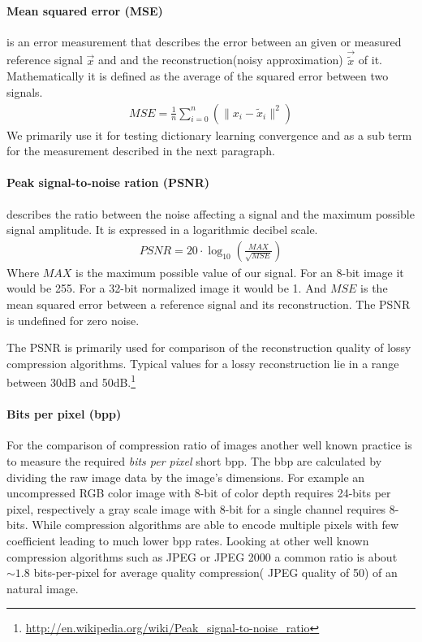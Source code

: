 \paragraph{Mean squared error (MSE)} is an error measurement that
describes the error between an given or measured reference signal $\vec{x}$
and and the reconstruction(noisy approximation) $\vec{\tilde{x}}$ of it.
Mathematically it is defined as the average of the squared error between two
signals.
\begin{align}
 MSE = \frac{1}{n} \sum_{i=0}^{n} \left( {\lVert x_i -
\tilde{x}_i\rVert^{2}}\right)
\end{align}
We primarily use it for testing dictionary learning convergence and as a
sub term for the measurement described in the next paragraph.

\paragraph{Peak signal-to-noise ration (PSNR)} describes the ratio between the
noise affecting a signal and the maximum possible signal amplitude. It is
expressed in a logarithmic decibel scale.
\begin{align}
 PSNR = 20 \cdot \log_{10} \left(\frac{MAX}{\sqrt{MSE}}\right)
\end{align}
Where $MAX$ is the maximum possible value of our signal. For an 8-bit
image it would be 255. For a 32-bit normalized image it would be 1. And $MSE$ is
the mean squared error between a reference signal and its reconstruction. The
PSNR is undefined for zero noise.

The PSNR is primarily used for comparison of the reconstruction quality of
lossy compression algorithms. Typical values for a lossy reconstruction lie in
a range between 30dB and
50dB.\footnote{\url{http://en.wikipedia.org/wiki/Peak_signal-to-noise_ratio}}

\paragraph{Bits per pixel (bpp)} 
For the comparison of compression ratio of images another well known practice is
to measure the required \emph{bits per pixel} short bpp. The bbp are calculated
by dividing the raw image data by the image's dimensions. For example an
uncompressed RGB color image with 8-bit of color depth requires 24-bits per
pixel, respectively a gray scale image with 8-bit for a single channel requires
8-bits. While compression algorithms are able to encode multiple pixels with few
coefficient leading to much lower bpp rates.
Looking at other well known compression algorithms such as JPEG or
JPEG 2000 a common ratio is about $\sim1.8$ bits-per-pixel for average
quality compression( JPEG quality of 50) of an natural image. 

